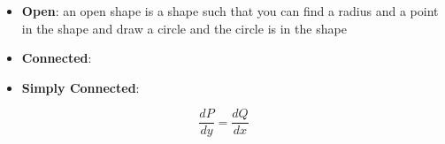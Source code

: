     \begin{itemize}
      \item \textbf{Open}: an open shape is a shape such that you
      can find a radius and a point in the shape and draw a circle
      and the circle is in the shape
      \item \textbf{Connected}:
      \item \textbf{Simply Connected}:
    \end{itemize}

    \begin{equation}
      \frac{dP}{dy} = \frac{dQ}{dx}
    \end{equation}